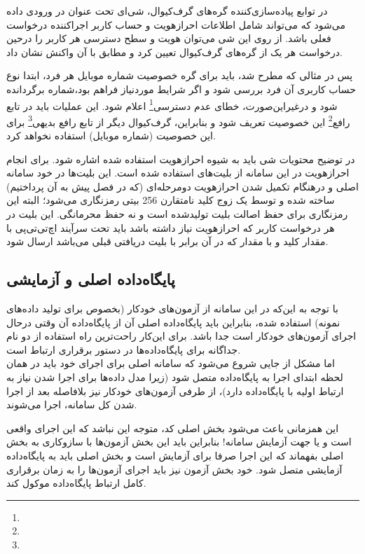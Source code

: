 در توابع پیاده‌سازی‌کننده گره‌های گرف‌کیوال، شی‌ای تحت عنوان  در ورودی داده می‌شود که می‌تواند شامل اطلاعات احرازهویت و حساب کاربر اجراکننده درخواست فعلی باشد. از روی این شی می‌توان هویت و سطح دسترسی هر کاربر را درحین درخواست هر یک از گره‌های گرف‌کیوال تعیین کرد و مطابق با آن واکنش نشان داد.

پس در مثالی که مطرح شد، باید برای گره خصوصیت شماره موبایل هر فرد، ابتدا نوع حساب کاربری آن فرد بررسی شود و اگر شرایط موردنیاز فراهم بود،‌شماره برگردانده شود و درغیراین‌صورت،‌ خطای عدم دسترسی\footnote{} اعلام شود. این عملیات باید در تابع رافع\footnote{} این خصوصیت تعریف شود و بنابراین، گرف‌کیوال دیگر از تابع رافع بدیهی\footnote{} برای این خصوصیت (شماره موبایل) استفاده نخواهد کرد.

در توضیح محتویات شی  باید به شیوه احرازهویت استفاده شده اشاره شود. برای انجام احرازهویت در این سامانه از بلیت‌های  استفاده شده است. این بلیت‌ها در خود سامانه اصلی و درهنگام تکمیل شدن احرازهویت دومرحله‌ای (که در فصل پیش به آن پرداختیم) ساخته شده و توسط یک زوج کلید نامتقارن 256 بیتی رمزنگاری می‌شود؛ البته این رمزنگاری برای حفظ اصالت بلیت تولیدشده است و نه حفظ محرمانگی. این بلیت در هر درخواست کاربر که احرازهویت نیاز داشته باشد باید تحت سرآیند اچ‌تی‌تی‌پی با مقدار کلید  و با مقدار  که در آن  برابر با بلیت دریافتی قبلی می‌باشد ارسال شود\cite{jwt}. 

\subsection{پایگاه‌داده اصلی و آزمایشی}

با توجه به این‌که در این سامانه از آزمون‌های خودکار (بخصوص برای تولید داده‌های نمونه) استفاده شده، بنابراین باید پایگاه‌داده اصلی آن از پایگاه‌داده آن وقتی درحال اجرای آزمون‌های خودکار است جدا باشد. برای این‌کار راحت‌ترین راه استفاده از دو نام جداگانه برای پایگاه‌داده‌ها در دستور برقراری ارتباط است.\\

اما مشکل از جایی شروع می‌شود که سامانه اصلی برای اجرای خود باید در همان لحظه ابتدای اجرا به پایگاه‌داده متصل شود (زیرا مدل داده‌ها برای اجرا شدن نیاز به ارتباط اولیه با پایگاه‌داده دارد)، از طرفی آزمون‌های خودکار نیز بلافاصله بعد از اجرا شدن کل سامانه، اجرا می‌شوند.

این همزمانی باعث می‌شود بخش اصلی کد، متوجه این نباشد که این اجرای واقعی است و یا جهت آزمایش سامانه! بنابراین باید این بخش آزمون‌ها با سازوکاری به بخش اصلی بفهماند که این اجرا صرفا برای آزمایش است و بخش اصلی باید به پایگاه‌داده آزمایشی متصل شود. خود بخش آزمون نیز باید اجرای آزمون‌ها را به زمان برقراری کامل ارتباط پایگاه‌داده موکول کند.\\

